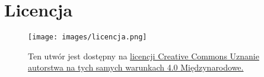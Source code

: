 \section*{Licencja}
    \begin{figure}[h]
    	\begin{minipage}[c]{0.25\textwidth}
    		\texttt{[image: images/licencja.png]}
    	\end{minipage}\hfill
    	\begin{minipage}[c]{0.75\textwidth}
    		\caption*{
    			Ten utwór jest dostępny na 
    			\href{https://creativecommons.org/licenses/by-sa/4.0/}{licencji Creative Commons Uznanie autorstwa
    			na tych samych warunkach 4.0 Międzynarodowe.}
    		}
    	\end{minipage}
    \end{figure}